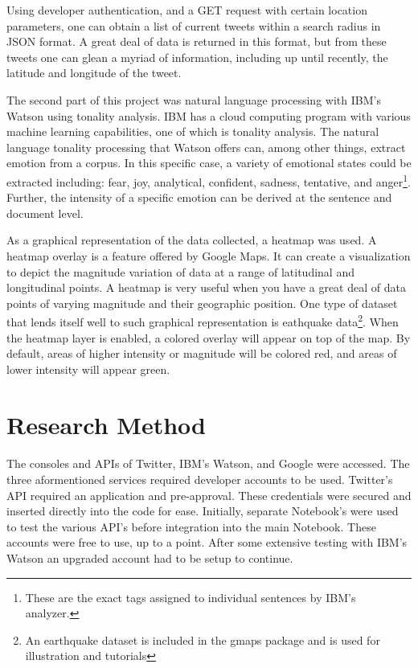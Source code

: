 \documentclass[12pt, oneside]{article}
\begin{document}
Using developer authentication, and a GET request with certain location
parameters, one can obtain a list of current tweets within a search radius in
JSON format. A great deal of data is returned in this format, but from
these tweets one can glean a myriad of information, including up until
recently, the latitude and longitude of the tweet.

The second part of this project was natural language processing with IBM's
Watson using tonality analysis. IBM has a cloud computing program with various
machine learning capabilities\cite{IBM}, one of which is tonality analysis. The
natural language tonality processing that Watson offers can, among other
things, extract emotion from a corpus. In this specific case, a variety of
emotional states could be extracted including: fear, joy, analytical,
confident, sadness, tentative, and anger\footnote{These are the exact tags
assigned to individual sentences by IBM's analyzer.}. Further, the intensity of
a specific
emotion can be derived at the sentence and document level.

As a graphical representation of the data collected, a heatmap was used. A
heatmap overlay is a feature offered by Google Maps. It can create a
visualization to depict the magnitude variation of data at a range of
latitudinal and longitudinal points. A heatmap is very useful when you have a
great deal of data points of varying magnitude and their geographic position.
One type of dataset that lends itself well to such graphical representation is
eathquake data\footnote{An earthquake
dataset is included in the gmaps package and is used for illustration and
tutorials}. When the heatmap layer is enabled, a colored overlay will appear on
top of the map. By default, areas of higher intensity or magnitude will be
colored red, and areas of lower intensity will appear green\cite{Google}.

\section{Research Method}
\paragraph{}
The consoles and APIs of Twitter, IBM's Watson, and Google were
accessed. The three aformentioned services required developer accounts to be
used. Twitter's API required an application and pre-approval. These
credentials were secured and inserted directly into the code for ease.
Initially, separate Notebook's were used to test the various API's before
integration into the main Notebook. These accounts were free to use, up to a
point. After some extensive testing with IBM's Watson an
upgraded account had to be setup to continue.
\end{document}
